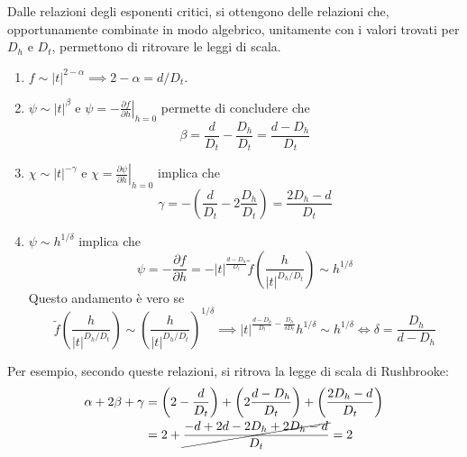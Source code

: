 \documentclass[11pt, a4paper]{scrartcl}
\theoremstyle{style}
\theoremstyle{style1}
\newcommand*\Eval[3]{\left.#1\right\rvert_{#2}^{#3}}
\numberwithin{equation}{subsection}
\begin{document}
Dalle relazioni degli esponenti critici, si ottengono delle relazioni che, opportunamente combinate in modo algebrico, unitamente con i valori trovati per $D_h$ e $D_t$, permettono di ritrovare le leggi di scala.
\begin{enumerate}[(1).]
	\item $f\sim\lvert t \rvert ^{2- \alpha }\implies 2 - \alpha = d / D_t$.
	\item $\psi  \sim \lvert t \rvert ^{\beta }$ e $\psi  = - \Eval{\frac{\partial f}{\partial h} }{h=0}{}$ permette di concludere che
		\[
		\beta  = \frac{d}{D_t} - \frac{D_h}{D_t} = \frac{d-D_h}{D_t}
		\] 
	\item $\chi \sim\lvert t \rvert ^{-\gamma}$ e $\chi = \Eval{\frac{\partial \psi }{\partial h} }{h=0}{}$ implica che
		\[
		\gamma = - \left(\frac{d}{D_t}-2 \frac{D_h}{D_t}\right)  = \frac{2D_h - d}{D_t}
		\] 
	\item $\psi \sim h^{1 / \delta }$ implica che 
		\[
		\psi  = - \frac{\partial f}{\partial h}  = - \lvert t \rvert ^{\frac{d-D_h}{D_t}} \tilde{f}\left(\frac{h}{\lvert t \rvert ^{D_h / D_t}}\right)  \sim h^{1 / \delta } 
		\] 
		Questo andamento \`e vero se 
		\[
		\tilde{f} \left(\frac{h}{\lvert t \rvert ^{D_h / D_t}}\right) \sim \left(\frac{h}{\lvert t \rvert ^{D_h / D_t}}\right) ^{1 / \delta } \implies \lvert t \rvert ^{\frac{d - D_h}{D_t} - \frac{D_h}{\delta D_t}} h^{1 / \delta } \sim h ^{1 / \delta } \iff \delta = \frac{D_h}{d-D_h}
		\] 
\end{enumerate}
Per esempio, secondo queste relazioni, si ritrova la legge di scala di Rushbrooke:
\[
	\begin{split}
		\alpha  + 2\beta  + \gamma &= \left(2 -\frac{d}{D_t}\right) + \left(2 \frac{d-D_h}{D_t}\right) + \left(\frac{2D_h - d}{D_t}\right)\\
					   &= 2 + \cancel{\frac{-d + 2 d - 2D_h + 2D_h - d}{D_t}} = 2
	\end{split}
\] 
\end{document}
